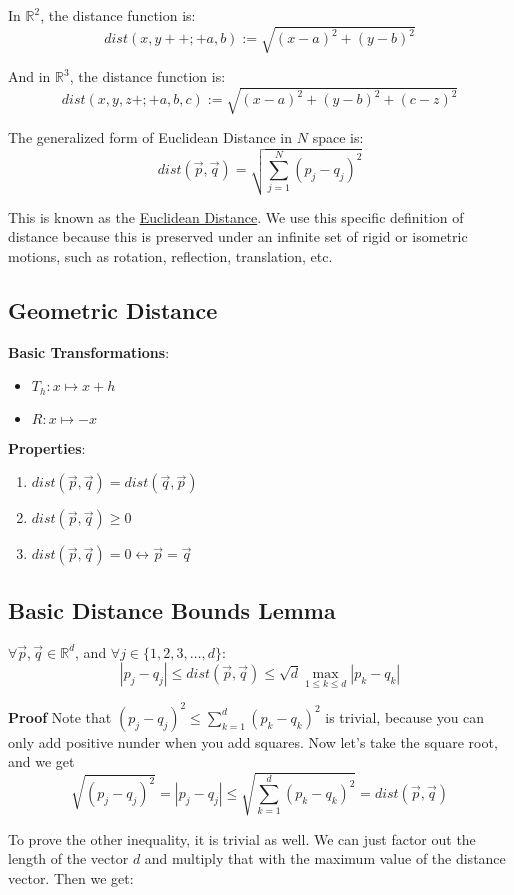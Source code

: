 \documentclass[11 pt, twoside]{article}
\begin{document}
In $\mathbb{R}^2$, the distance function is:
$$dist(x, y++;+a,b) := \sqrt{(x - a)^2 + (y - b)^2}$$

And in $\mathbb{R}^3$, the distance function is:
$$dist(x, y, z+;+ a,b,c) := \sqrt{(x - a)^2 + (y - b)^2 + (c - z)^2}$$

The generalized form of Euclidean Distance in $N$ space is:
$$dist(\vec{p}, \vec{q}) = \sqrt{\sum_{j = 1}^N (p_j - q_j)^2}$$

This is known as the \underline{Euclidean Distance}. We use this specific
definition of distance because this is preserved under an infinite set of rigid
or isometric motions, such as rotation, reflection, translation, etc.

\subsection{Geometric Distance}

\textbf{Basic Transformations}:
\begin{itemize}
\item $T_h : x \mapsto x+h$
\item $R: x \mapsto -x$
\end{itemize}

\textbf{Properties}:
\begin{enumerate}
\item $dist(\vec{p}, \vec{q}) = dist(\vec{q}, \vec{p})$
\item $dist(\vec{p}, \vec{q}) \geq 0$
\item $dist(\vec{p}, \vec{q}) = 0 \leftrightarrow \vec{p} = \vec{q}$
\end{enumerate}

\subsection{Basic Distance Bounds Lemma}
$\forall \vec{p}, \vec{q} \in
\mathbb{R}^d$, and $\forall j \in \{1,2,3,\dots,d\}$:
$$|p_j - q_j| \leq dist(\vec{p}, \vec{q}) \leq \sqrt{d} \max_{1 \leq k \leq
d} |p_k - q_k|$$

\textbf{Proof}
Note that $(p_j - q_j)^2 \leq \sum_{k = 1}^d (p_k - q_k)^2$ is trivial, because
you can only add positive nunder when you add squares. Now let's take the square
root, and we get
$$\sqrt{(p_j - q_j)^2} = |p_j - q_j| \leq \sqrt{\sum_{k = 1}^d (p_k - q_k)^2} =
dist(\vec{p}, \vec{q})$$

To prove the other inequality, it is trivial as well. We can just factor out the
length of the vector $d$ and multiply that with the maximum value of the
distance vector. Then we get:
\end{document}
